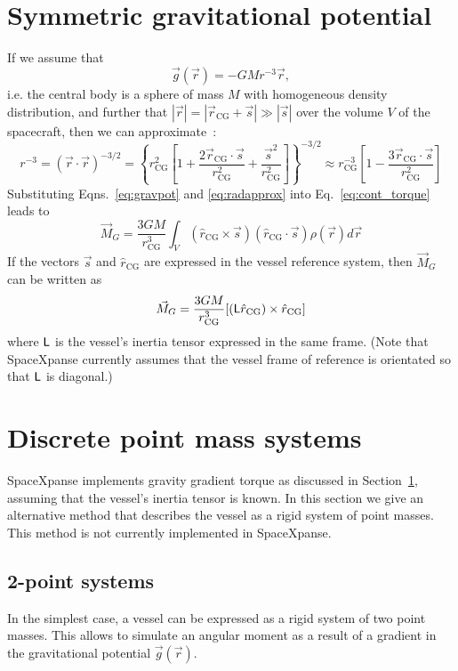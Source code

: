 \documentclass[a4paper]{article}
\begin{document}
\section{Symmetric gravitational potential}\label{sec:sympot}
If we assume that
\begin{equation}\label{eq:gravpot}
\vec{g}(\vec{r}) = -GMr^{-3}\vec{r},
\end{equation}
i.e. the central body is a sphere of mass $M$ with homogeneous density distribution, and further that $|\vec{r}| = |\vec{r}_\text{CG} + \vec{s}| \gg |\vec{s}|$ over the volume $V$ of the spacecraft, then we can approximate~\cite{wertz1978}:
\begin{equation}\label{eq:radapprox}
r^{-3} = (\vec{r}\cdot\vec{r})^{-3/2} =
\left\{ r_\text{CG}^2 \left[ 1 + \frac{2\vec{r}_\text{CG}\cdot\vec{s}}{r_\text{CG}^2} + \frac{\vec{s}^2}{r_\text{CG}^2} \right] \right\}^{-3/2} \approx
r_\text{CG}^{-3} \left[ 1 - \frac{3 \vec{r}_\text{CG}\cdot\vec{s}}{r_\text{CG}^2} \right]
\end{equation}
Substituting Eqns.~\ref{eq:gravpot} and \ref{eq:radapprox} into Eq.~\ref{eq:cont_torque} leads to
\begin{equation}
\vec{M}_G = \frac{3GM}{r_\text{CG}^3} \int_V (\hat{r}_\text{CG} \times \vec{s}) (\hat{r}_\text{CG} \cdot \vec{s}) \rho(\vec{r}) d\vec{r}
\end{equation}
If the vectors $\vec{s}$ and $\hat{r}_\text{CG}$ are expressed in the vessel reference system, then $\vec{M}_G$ can be written as
\begin{equation}
\vec{M}_G = \frac{3GM}{r_\text{CG}^3} [(\mathsf{L}\hat{r}_\text{CG}) \times \hat{r}_\text{CG}]
\end{equation}
where $\mathsf{L}$ is the vessel's inertia tensor expressed in the same frame. (Note that SpaceXpanse currently assumes that the vessel frame of reference is orientated so that $\mathsf{L}$ is diagonal.)


\section{Discrete point mass systems}
SpaceXpanse implements gravity gradient torque as discussed in Section~\ref{sec:sympot}, assuming that the vessel's inertia tensor is known. In this section we give an alternative method that describes the vessel as a rigid system of point masses. This method is not currently implemented in SpaceXpanse.

\subsection{2-point systems}
In the simplest case, a vessel can be expressed as a rigid system of two point masses. This allows to simulate an angular moment as a result of a gradient in the gravitational potential $\vec{g}(\vec{r})$.
\end{document}
